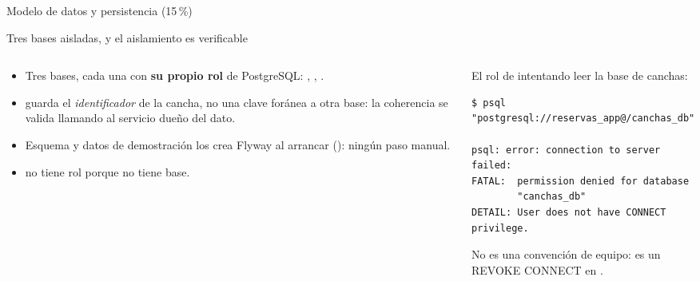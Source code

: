 %
%
%

%
       {Modelo de datos y persistencia (15\,\%)}

\begin{frame}[fragile]{Tres bases aisladas, y el aislamiento es verificable}

  \begin{columns}[T]
    \begin{column}{0.47\textwidth}
      \begin{itemize}\scriptsize
        \item Tres bases, cada una con \textbf{su propio rol} de PostgreSQL:
              , , .
        \item {} guarda el \emph{identificador} de la cancha, no
              una clave foránea a otra base: la coherencia se valida llamando
              al servicio dueño del dato.
        \item Esquema y datos de demostración los crea Flyway al arrancar
              (): ningún paso manual.
        \item {} no tiene rol porque no tiene base.
      \end{itemize}
    \end{column}
    \begin{column}{0.50\textwidth}
      {\scriptsize El rol de  intentando leer la base de
      canchas:}
      \begin{lstlisting}[basicstyle=\ttfamily\tiny]
$ psql "postgresql://reservas_app@/canchas_db"

psql: error: connection to server failed:
FATAL:  permission denied for database
        "canchas_db"
DETAIL: User does not have CONNECT privilege.
      \end{lstlisting}
      {\scriptsize\color{textoSuave} No es una convención de equipo:
      es un \alert{REVOKE CONNECT} en
      .}
    \end{column}
  \end{columns}
\end{frame}
